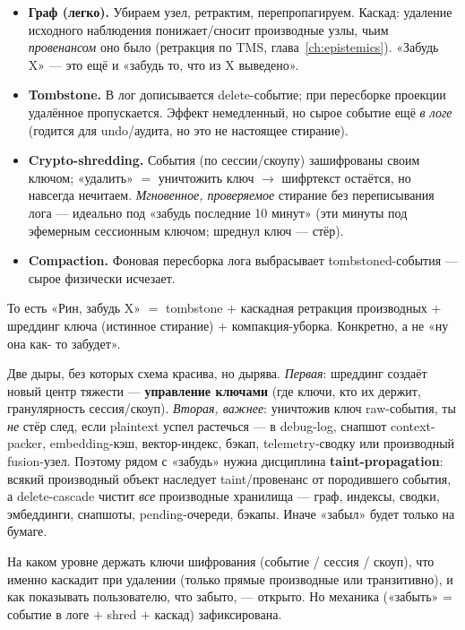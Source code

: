 \begin{itemize}\itemsep2pt
\item \textbf{Граф (легко).} Убираем узел, ретрактим, перепропагируем. Каскад: удаление
исходного наблюдения понижает/сносит производные узлы, чьим \emph{провенансом} оно
было (ретракция по TMS, глава~\ref{ch:epistemics}). «Забудь X» — это ещё и «забудь
то, что из X выведено».
\item \textbf{Tombstone.} В лог дописывается delete-событие; при пересборке проекции
удалённое пропускается. Эффект немедленный, но сырое событие ещё \emph{в логе}
(годится для undo/аудита, но это не настоящее стирание).
\item \textbf{Crypto-shredding.} События (по сессии/скоупу) зашифрованы своим ключом;
«удалить» $=$ уничтожить ключ $\to$ шифртекст остаётся, но навсегда нечитаем.
\emph{Мгновенное, проверяемое} стирание без переписывания лога — идеально под «забудь
последние 10 минут» (эти минуты под эфемерным сессионным ключом; шреднул ключ —
стёр).
\item \textbf{Compaction.} Фоновая пересборка лога выбрасывает tombstoned-события —
сырое физически исчезает.
\end{itemize}

То есть «Рин, забудь X» $=$ tombstone $+$ каскадная ретракция производных $+$
шреддинг ключа (истинное стирание) $+$ компакция-уборка. Конкретно, а не «ну она как-
то забудет».

\begin{pitfall}
Две дыры, без которых схема красива, но дырява. \emph{Первая}: шреддинг создаёт новый
центр тяжести — \textbf{управление ключами} (где ключи, кто их держит, гранулярность
сессия/скоуп). \emph{Вторая, важнее}: уничтожив ключ raw-события, ты \emph{не} стёр
след, если plaintext успел растечься — в debug-log, снапшот context-packer,
embedding-кэш, вектор-индекс, бэкап, telemetry-сводку или производный fusion-узел.
Поэтому рядом с «забудь» нужна дисциплина \textbf{taint-propagation}: всякий
производный объект наследует taint/провенанс от породившего события, а delete-cascade
чистит \emph{все} производные хранилища — граф, индексы, сводки, эмбеддинги, снапшоты,
pending-очереди, бэкапы. Иначе «забыл» будет только на бумаге.
\end{pitfall}

\begin{openq}
На каком уровне держать ключи шифрования (событие / сессия / скоуп), что именно
каскадит при удалении (только прямые производные или транзитивно), и как показывать
пользователю, что забыто, — открыто. Но механика («забыть» = событие в логе $+$
shred $+$ каскад) зафиксирована.
\end{openq}

